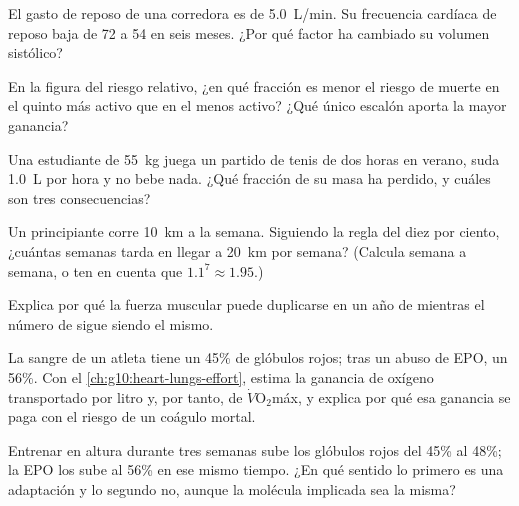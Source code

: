 \begin{exercise}[$\star\star$]\label{exo:g10:sport-and-health:7}
El gasto de reposo de una corredora es de \qty{5.0}{L/min}. Su
frecuencia cardíaca de reposo baja de 72 a 54 en seis meses. ¿Por qué
factor ha cambiado su volumen sistólico?
\end{exercise}

\begin{exercise}[$\star\star$]\label{exo:g10:sport-and-health:8}
En la figura del riesgo relativo, ¿en qué fracción es menor el riesgo
de muerte en el quinto más activo que en el menos activo? ¿Qué único
escalón aporta la mayor ganancia?
\end{exercise}

\begin{exercise}[$\star\star$]\label{exo:g10:sport-and-health:9}
Una estudiante de \qty{55}{kg} juega un partido de tenis de dos horas
en verano, suda \qty{1.0}{L} por hora y no bebe nada. ¿Qué fracción de
su masa ha perdido, y cuáles son tres consecuencias?
\end{exercise}

\begin{exercise}[$\star\star$]\label{exo:g10:sport-and-health:10}
Un principiante corre \qty{10}{km} a la semana. Siguiendo la regla del
diez por ciento, ¿cuántas semanas tarda en llegar a \qty{20}{km} por
semana? (Calcula semana a semana, o ten en cuenta que $1.1^7 \approx 1.95$.)
\end{exercise}

\begin{exercise}[$\star\star$]\label{exo:g10:sport-and-health:11}
Explica por qué la fuerza muscular puede duplicarse en un año de
 mientras el número de  sigue siendo el
mismo.
\end{exercise}

\begin{exercise}[$\star\star\star$]\label{exo:g10:sport-and-health:12}
La sangre de un atleta tiene un 45\% de glóbulos rojos; tras un abuso
de EPO, un 56\%. Con el \cref{ch:g10:heart-lungs-effort}, estima la
ganancia de oxígeno transportado por litro y, por tanto, de
$\dot V\!\mathrm{O_2}$máx, y explica por qué esa ganancia se paga con
el riesgo de un coágulo mortal.
\end{exercise}

\begin{exercise}[$\star\star\star$]\label{exo:g10:sport-and-health:13}
Entrenar en altura durante tres semanas sube los glóbulos rojos del
45\% al 48\%; la EPO los sube al 56\% en ese mismo tiempo. ¿En qué
sentido lo primero es una adaptación y lo segundo no, aunque la
molécula implicada sea la misma?
\end{exercise}

